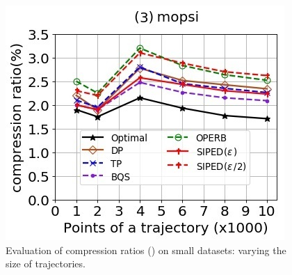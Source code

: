 \begin{figure}[tb!]
	\includegraphics[scale=0.500]{Figures/Exp-PED-CR-size-mopsi.jpg}		
	\vspace{-2ex}
	\caption{\small Evaluation of compression ratios (\ped) on small datasets: varying the size of
		trajectories.}
	\label{fig:cr-ped-size}
	\vspace{-2ex}
\end{figure}
